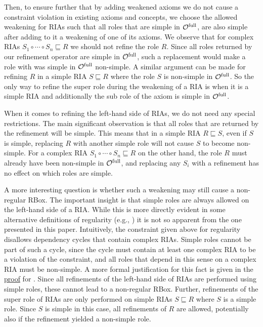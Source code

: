 \documentclass[
]{ceurart}
\begin{document}
Then, to ensure further that by adding weakened axioms we do not cause a constraint violation in existing axioms and concepts, we choose the allowed weakening for RIAs such that all roles that are simple in ${\mathcal{O}^\textnormal{full}}$, are also simple after adding to it a weakening of one of its axioms. We observe that for complex RIAs $S_1 \circ \cdots \circ S_n \sqsubseteq R$ we should not refine the role $R$. Since all roles returned by our refinement operator are simple in ${\mathcal{O}^\textnormal{full}}$, such a replacement would make a role with was simple in ${\mathcal{O}^\textnormal{full}}$ non-simple. A similar argument can be made for refining $R$ in a simple RIA $S \sqsubseteq R$ where the role $S$ is non-simple in ${\mathcal{O}^\textnormal{full}}$. So the only way to refine the super role during the weakening of a RIA is when it is a simple RIA and additionally the sub role of the axiom is simple in ${\mathcal{O}^\textnormal{full}}$.

When it comes to refining the left-hand side of RIAs, we do not need any special restrictions. The main significant observation is that all roles that are returned by the refinement will be simple. This means that in a simple RIA $R \sqsubseteq S$, even if $S$ is simple, replacing $R$ with another simple role will not cause $S$ to become non-simple. For a complex RIA $S_1 \circ \cdots \circ S_n \sqsubseteq R$ on the other hand, the role $R$ must already have been non-simple in ${\mathcal{O}^\textnormal{full}}$, and replacing any $S_i$ with a refinement has no effect on which roles are simple.

A more interesting question is whether such a weakening may still cause a non-regular RBox. The important insight is that simple roles are always allowed on the left-hand side of a RIA. While this is more directly evident in some alternative definitions of regularity (e.g., \cite{rudolph2011foundations}) it is not so apparent from the one presented in this paper. Intuitively, the constraint given above for regularity disallows dependency cycles that contain complex RIAs. Simple roles cannot be part of such a cycle, since the cycle must contain at least one complex RIA to be a violation of the constraint, and all roles that depend in this sense on a complex RIA must be non-simple. A more formal justification for this fact is given in the \hyperref[proof:regularity]{proof} for .
Since all refinements of the left-hand side of RIAs are performed using simple roles, these cannot lead to a non-regular RBox. Further, refinements of the super role of RIAs are only performed on simple RIAs $S \sqsubseteq R$ where $S$ is a simple role. Since $S$ is simple in this case, all refinements of $R$ are allowed, potentially also if the refinement yielded a non-simple role.
\end{document}
